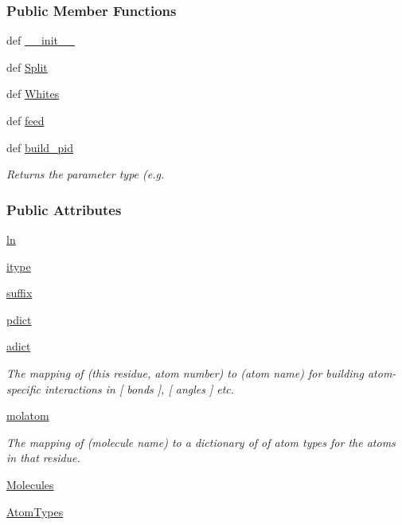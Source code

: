 \subsubsection*{Public Member Functions}
\begin{DoxyCompactItemize}
\item 
def \hyperlink{classforcebalance_1_1BaseReader_ae914de6033b9920eadb5632074e69d47}{\-\_\-\-\_\-init\-\_\-\-\_\-}
\item 
def \hyperlink{classforcebalance_1_1BaseReader_acded199bbc003eb93d071a972ef38901}{Split}
\item 
def \hyperlink{classforcebalance_1_1BaseReader_af2af8a559625614474a1c6fe245b5e13}{Whites}
\item 
def \hyperlink{classforcebalance_1_1BaseReader_a3c46942ef8cc25ece21d52be5b7ba05f}{feed}
\item 
def \hyperlink{classforcebalance_1_1BaseReader_aab2c64ccf0f803d4eff3bbf40a6cb0b7}{build\-\_\-pid}
\begin{DoxyCompactList}\small\item\em Returns the parameter type (e.\-g. \end{DoxyCompactList}\end{DoxyCompactItemize}
\subsubsection*{Public Attributes}
\begin{DoxyCompactItemize}
\item 
\hyperlink{classforcebalance_1_1BaseReader_a80c8e3bea212600742968aa8669e557b}{ln}
\item 
\hyperlink{classforcebalance_1_1BaseReader_a22ff3f4c684c728e019d801fface36f6}{itype}
\item 
\hyperlink{classforcebalance_1_1BaseReader_a48ef0584a1b6b4b6f8eb741ad8465db8}{suffix}
\item 
\hyperlink{classforcebalance_1_1BaseReader_aaf18c900d6055ed4b5124f6bb26164c1}{pdict}
\item 
\hyperlink{classforcebalance_1_1BaseReader_a2c46ad6b66cf09a30e917ce4a1997e2a}{adict}
\begin{DoxyCompactList}\small\item\em The mapping of (this residue, atom number) to (atom name) for building atom-\/specific interactions in \mbox{[} bonds \mbox{]}, \mbox{[} angles \mbox{]} etc. \end{DoxyCompactList}\item 
\hyperlink{classforcebalance_1_1BaseReader_ab444c213e15929253dd73395ac5f19fc}{molatom}
\begin{DoxyCompactList}\small\item\em The mapping of (molecule name) to a dictionary of of atom types for the atoms in that residue. \end{DoxyCompactList}\item 
\hyperlink{classforcebalance_1_1BaseReader_a4369b5fb663a83b11602daa71db6862e}{Molecules}
\item 
\hyperlink{classforcebalance_1_1BaseReader_a69ca7d949a4a3df4d9f61e617fe0e270}{Atom\-Types}
\end{DoxyCompactItemize}


